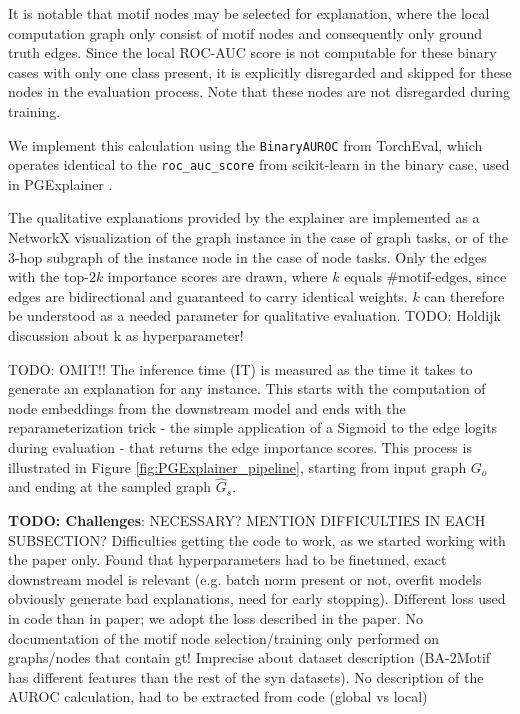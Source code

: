 It is notable that motif nodes may be selected for explanation, where the local computation graph only consist of motif nodes and consequently only ground truth edges. Since the local ROC-AUC score is not computable for these binary cases with only one class present, it is explicitly disregarded and skipped for these nodes in the evaluation process. Note that these nodes are not disregarded during training.

We implement this calculation using the \verb|BinaryAUROC| from TorchEval, which operates identical to the \verb|roc_auc_score| from scikit-learn \cite{pedregosa2011scikit} in the binary case, used in PGExplainer \cite{luo2020parameterized}.

The qualitative explanations provided by the explainer are implemented as a NetworkX visualization of the graph instance in the case of graph tasks, or of the $3$-hop subgraph of the instance node in the case of node tasks. Only the edges with the top-$2k$ importance scores are drawn, where $k$ equals $\text{\#motif-edges}$, since edges are bidirectional and guaranteed to carry identical weights. $k$ can therefore be understood as a needed parameter for qualitative evaluation. TODO: Holdijk discussion about k as hyperparameter!

TODO: OMIT!! The inference time (IT) is measured as the time it takes to generate an explanation for any instance. This starts with the computation of node embeddings from the downstream model and ends with the reparameterization trick - the simple application of a Sigmoid to the edge logits during evaluation - that returns the edge importance scores. This process is illustrated in Figure \ref{fig:PGExplainer_pipeline}, starting from input graph $G_o$ and ending at the sampled graph $\hat{G}_s$. \bigskip

\textbf{TODO: Challenges}: NECESSARY? MENTION DIFFICULTIES IN EACH SUBSECTION? Difficulties getting the code to work, as we started working with the paper only. Found that hyperparameters had to be finetuned, exact downstream model is relevant (e.g. batch norm present or not, overfit models obviously generate bad explanations, need for early stopping). Different loss used in code than in paper; we adopt the loss described in the paper. No documentation of the motif node selection/training only performed on graphs/nodes that contain gt! Imprecise about dataset description (BA-2Motif has different features than the rest of the syn datasets). No description of the AUROC calculation, had to be extracted from code (global vs local) \bigskip

